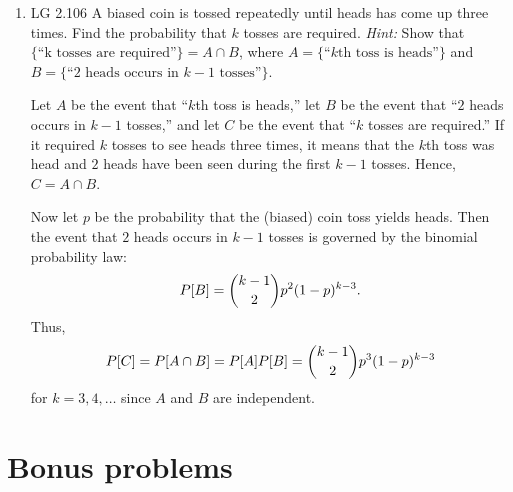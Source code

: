 \begin{enumerate}
	\item LG 2.106
	\ifdefined\sol
	A biased coin is tossed repeatedly until heads has come up three times.
	Find the probability that $k$ tosses are required.
	\emph{Hint:}
	Show that $\{\mbox{``k tosses are required''}\} = A \cap B$, where
	$A = \{\mbox{``$k$th toss is heads''}\}$ and $B = \{ \mbox{``2 heads occurs in $k - 1$ tosses''}\}$.
	\begin{solution}
		Let $A$ be the event that ``$k$th toss is heads,''
		let $B$ be the event that ``$2$ heads occurs in $k - 1$ tosses,''
		and let $C$ be the event that ``$k$ tosses are required.''
		If it required $k$ tosses to see heads three times,
		it means that the $k$th toss was head and $2$ heads have been seen
		during the first $k-1$ tosses.
		Hence, $C = A\cap B$.

		Now let $p$ be the probability that the (biased) coin toss yields heads.
		Then the event that $2$ heads occurs in $k-1$ tosses is governed by the binomial probability law:
		\[
			P[B] = {k-1 \choose 2}p^2 (1-p)^{k-3}.
		\]
		Thus,
		\[
			P[C] = P[A\cap B] = P[A] P[B]
			= {k-1 \choose 2} p^3 (1-p)^{k-3}
		\]
		for $k=3,4,\ldots$ since $A$ and $B$ are independent.
	\end{solution}
	\fi

\end{enumerate}

\section*{Bonus problems}

